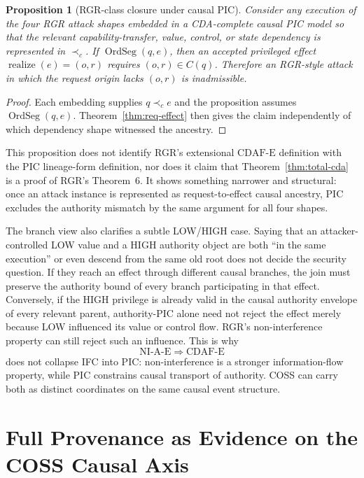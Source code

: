 \documentclass[10pt,twocolumn]{article}
\newcommand{\CDAF}{\mathrm{CDAF\text{-}E}}
\newcommand{\Realize}{\operatorname{realize}}
\newcommand{\hb}{\prec_{c}}
\newcommand{\OrdSeg}{\operatorname{OrdSeg}}
\newtheorem{proposition}{Proposition}
\begin{document}
\begin{proposition}[RGR-class closure under causal PIC]
\label{prop:rgr-closure}
Consider any execution of the four RGR attack shapes embedded in a CDA-complete
causal PIC model so that the relevant capability-transfer, value, control, or
state dependency is represented in $\hb$.  If $\OrdSeg(q,e)$, then an accepted privileged effect
$\Realize(e)=(o,r)$ requires $(o,r)\in C(q)$.  Therefore an RGR-style attack in which the request
origin lacks $(o,r)$ is inadmissible.
\end{proposition}

\begin{proof}
Each embedding supplies $q\hb e$ and the proposition assumes $\OrdSeg(q,e)$.  Theorem~\ref{thm:req-effect} then gives the
claim independently of which dependency shape witnessed the ancestry.
\end{proof}

This proposition does not identify RGR's extensional $\CDAF$ definition with
the PIC lineage-form definition, nor does it claim that Theorem~\ref{thm:total-cda}
is a proof of RGR's Theorem~6.  It shows something narrower and structural:
once an attack instance is represented as request-to-effect causal ancestry,
PIC excludes the authority mismatch by the same argument for all four shapes.

The branch view also clarifies a subtle LOW/HIGH case.  Saying that an
attacker-controlled LOW value and a HIGH authority object are both ``in the
same execution'' or even descend from the same old root does not decide the
security question.  If they reach an effect through different causal branches,
the join must preserve the authority bound of every branch participating in
that effect.  Conversely, if the HIGH privilege is already valid in the causal
authority envelope of every relevant parent, authority-PIC alone need not reject
the effect merely because LOW influenced its value or control flow.  RGR's
non-interference property can still reject such an influence.  This is why
\begin{equation}
  \mathrm{NI\text{-}A\text{-}E}\Longrightarrow\CDAF
\end{equation}
does not collapse IFC into PIC: non-interference is a stronger information-flow
property, while PIC constrains causal transport of authority.  COSS can carry
both as distinct coordinates on the same causal event structure.



\section{Full Provenance as Evidence on the COSS Causal Axis}
\label{sec:fp-axis}
\end{document}
